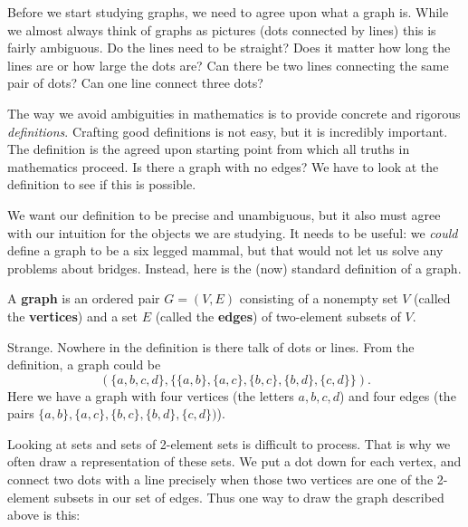 \documentclass[12pt,]{book}
\newcommand{\terminology}[1]{\textbf{#1}}
\theoremstyle{plain}
\theoremstyle{definition}
\theoremstyle{definition}
\theoremstyle{definition}
\numberwithin{equation}{chapter}
\begin{document}
\hypertarget{p-1508}{}%
Before we start studying graphs, we need to agree upon what a graph is.  		While we almost always think of graphs as pictures (dots connected by lines) this is fairly ambiguous.  Do the lines need to be straight?  Does it matter how long the lines are or how large the dots are?  Can there be two lines connecting the same pair of dots?  Can one line connect three dots?%
\par
\hypertarget{p-1509}{}%
The way we avoid ambiguities in mathematics is to provide concrete and rigorous \emph{definitions}.  Crafting good definitions is not easy, but it is incredibly important.  The definition is the agreed upon starting point from which all truths in mathematics proceed.  Is there a graph with no edges?  We have to look at the definition to see if this is possible.%
\par
\hypertarget{p-1510}{}%
We want our definition to be precise and unambiguous, but it also must agree with our intuition for the objects we are studying.  It needs to be useful: we \emph{could} define a graph to be a six legged mammal, but that would not let us solve any problems about bridges.  Instead, here is the (now) standard definition of a graph.%
\begin{assemblage}\label{assemblage-35}
\hypertarget{p-1511}{}%
A \terminology{graph} is an ordered pair \(G = (V, E)\) consisting of a nonempty set \(V\) (called the \terminology{vertices}) and a set \(E\) (called the \terminology{edges}) of two-element subsets of \(V\).%
\end{assemblage}
\hypertarget{p-1512}{}%
Strange.  Nowhere in the definition is there talk of dots or lines.  From the definition, a graph could be%
\begin{equation*}
(\{a,b,c,d\}, \{\{a,b\}, \{a,c\}, \{b,c\}, \{b,d\}, \{c,d\}\}).
\end{equation*}
Here we have a graph with four vertices  (the letters \(a, b, c, d\)) and four edges (the pairs \(\{a,b\}, \{a,c\}, \{b,c\}, \{b,d\}, \{c,d\})\)).%
\par
\hypertarget{p-1513}{}%
Looking at sets and sets of 2-element sets is difficult to process.  That is why we often draw a representation of these sets.  We put a dot down for each vertex, and connect two dots with a line precisely when those two vertices are one of the 2-element subsets in our set of edges.  Thus one way to draw the graph described above is this:%
\end{document}
